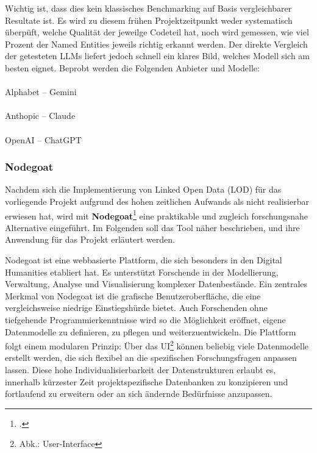 \documentclass[12pt, a4paper, ngerman, bidi=default]{article}
\makeatletter
\let\cite\footcite
\let\oldparagraph\paragraph%
\renewcommand{\paragraph}{
    \@ifstar%
      \xxxParagraphStar%
      \xxxParagraphNoStar%
 }
\newcommand{\xxxParagraphStar}[1]{\oldparagraph*{#1}\mbox{}}
\newcommand{\xxxParagraphNoStar}[1]{\oldparagraph{#1}\mbox{}}
\makeatother
\begin{document}
Wichtig ist, dass dies kein klassisches Benchmarking auf Basis vergleichbarer Resultate ist. Es wird zu diesem frühen Projektzeitpunkt weder systematisch überpüft, welche Qualität der jeweilge Codeteil hat, noch wird gemessen, wie viel Prozent der Named Entities jeweils richtig erkannt werden. Der direkte Vergleich der getesteten LLMs liefert jedoch schnell ein klares Bild, welches Modell sich am besten eignet. Beprobt werden die Folgenden Anbieter und Modelle:



\paragraph{Alphabet – Gemini}
\paragraph{Anthopic – Claude}
\paragraph{OpenAI – ChatGPT}


\subsubsection{Nodegoat}\label{subsec:Nodegoat_chapter}

Nachdem sich die Implementierung von Linked Open Data (LOD) für das vorliegende Projekt aufgrund des hohen zeitlichen 
Aufwands als nicht realisierbar erwiesen hat, wird mit \textbf{Nodegoat}\cite{kessels_nodegoat_2013}
eine praktikable und zugleich forschungsnahe Alternative eingeführt. Im Folgenden soll das Tool näher beschrieben, und ihre Anwendung für das Projekt erläutert werden.

Nodegoat ist eine webbasierte Plattform, die sich besonders in den Digital Humanities etabliert hat. Es unterstützt Forschende in der Modellierung, 
Verwaltung, Analyse und Visualisierung komplexer Datenbestände. Ein zentrales Merkmal von Nodegoat ist die grafische Benutzeroberfläche, die eine vergleichsweise niedrige Einstiegshürde bietet. 
Auch Forschenden ohne tiefgehende Programmierkenntnisse wird so die Möglichkeit  eröffnet, eigene Datenmodelle zu definieren, zu pflegen und weiterzuentwickeln. 
Die Plattform folgt einem modularen Prinzip: Über das UI\footnote{Abk.: User-Interface} können beliebig viele Datenmodelle 
erstellt werden, die sich flexibel an die spezifischen Forschungsfragen anpassen lassen. Diese hohe Individualisierbarkeit der Datenstrukturen erlaubt es, innerhalb kürzester Zeit projektspezifische 
Datenbanken zu konzipieren und fortlaufend zu erweitern oder an sich ändernde Bedürfnisse anzupassen.
\end{document}

